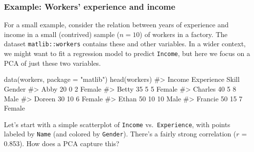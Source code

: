 \documentclass[
  letterpaper,
  10pt,
  krantz2]{krantz}
\makeatletter
\newenvironment{Shaded}{\begin{snugshade}}{\end{snugshade}}
\newcommand{\AttributeTok}[1]{\textcolor[rgb]{0.40,0.45,0.13}{#1}}
\newcommand{\CommentTok}[1]{\textcolor[rgb]{0.37,0.37,0.37}{#1}}
\newcommand{\ConstantTok}[1]{\textcolor[rgb]{0.56,0.35,0.01}{#1}}
\newcommand{\DecValTok}[1]{\textcolor[rgb]{0.68,0.00,0.00}{#1}}
\newcommand{\FloatTok}[1]{\textcolor[rgb]{0.68,0.00,0.00}{#1}}
\newcommand{\FunctionTok}[1]{\textcolor[rgb]{0.28,0.35,0.67}{#1}}
\newcommand{\NormalTok}[1]{\textcolor[rgb]{0.00,0.23,0.31}{#1}}
\newcommand{\OtherTok}[1]{\textcolor[rgb]{0.00,0.23,0.31}{#1}}
\newcommand{\SpecialCharTok}[1]{\textcolor[rgb]{0.37,0.37,0.37}{#1}}
\newcommand{\StringTok}[1]{\textcolor[rgb]{0.13,0.47,0.30}{#1}}
\newenvironment{kframe}{%
  \medskip{}
  \setlength{\fboxsep}{.8em}
  \def\at@end@of@kframe{}%
  \ifinner\ifhmode%
  \def\at@end@of@kframe{\end{minipage}}%
  \begin{minipage}{\columnwidth}%
  \fi\fi%
  \def\FrameCommand##1{\hskip\@totalleftmargin \hskip-\fboxsep
  \colorbox{shadecolor}{##1}\hskip-\fboxsep
      \hskip-\linewidth \hskip-\@totalleftmargin \hskip\columnwidth}%
  \MakeFramed {\advance\hsize-\width
    \@totalleftmargin\z@ \linewidth\hsize
    \@setminipage}}%
{\par\unskip\endMakeFramed%
  \at@end@of@kframe}
\renewenvironment{Shaded}{\begin{kframe}}{\end{kframe}}
\makeatother
\begin{document}
\subsubsection*{Example: Workers' experience and
income}\label{example-workers-experience-and-income}

For a small example, consider the relation between years of experience
and income in a small (contrived) sample (\(n = 10\)) of workers in a
factory. The dataset \texttt{matlib::workers} contains these and other
variables. In a wider context, we might want to fit a regression model
to predict \texttt{Income}, but here we focus on a PCA of just these two
variables.

\begin{Shaded}
\begin{Highlighting}[]
\FunctionTok{data}\NormalTok{(workers, }\AttributeTok{package =} \StringTok{"matlib"}\NormalTok{) }
\FunctionTok{head}\NormalTok{(workers)}
\CommentTok{\#\textgreater{}         Income Experience Skill Gender}
\CommentTok{\#\textgreater{} Abby        20          0     2 Female}
\CommentTok{\#\textgreater{} Betty       35          5     5 Female}
\CommentTok{\#\textgreater{} Charles     40          5     8   Male}
\CommentTok{\#\textgreater{} Doreen      30         10     6 Female}
\CommentTok{\#\textgreater{} Ethan       50         10    10   Male}
\CommentTok{\#\textgreater{} Francie     50         15     7 Female}
\end{Highlighting}
\end{Shaded}

Let's start with a simple scatterplot of \texttt{Income}
vs.~\texttt{Experience}, with points labeled by \texttt{Name} (and
colored by \texttt{Gender}). There's a fairly strong correlation (\(r\)
= 0.853). How does a PCA capture this?

\begin{Shaded}
\end{Shaded}
\end{document}
